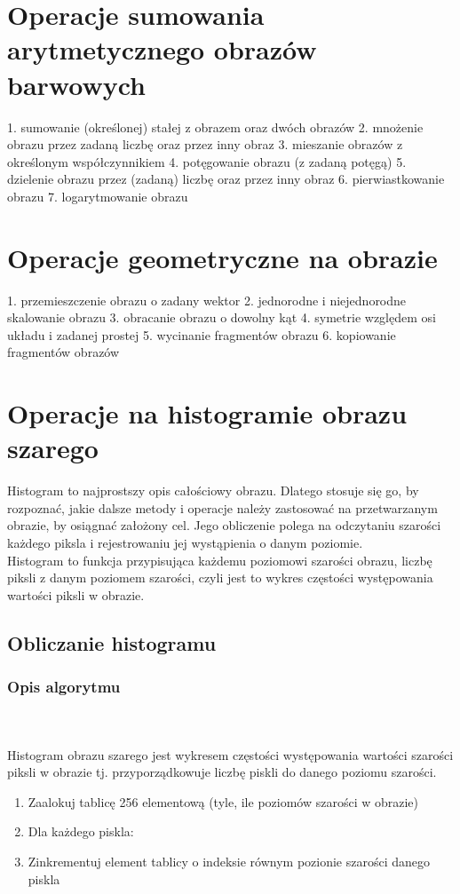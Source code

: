 \documentclass[final,a4paper,openany,12pt]{mwbk}
\begin{document}
\chapter{Operacje sumowania arytmetycznego obrazów barwowych}
1. sumowanie (określonej) stałej z obrazem oraz dwóch obrazów
2. mnożenie obrazu przez zadaną liczbę oraz przez inny obraz
3. mieszanie obrazów z określonym współczynnikiem
4. potęgowanie obrazu (z zadaną potęgą)
5. dzielenie obrazu przez (zadaną) liczbę oraz przez inny obraz
6. pierwiastkowanie obrazu
7. logarytmowanie obrazu

\chapter{Operacje geometryczne na obrazie}
1. przemieszczenie obrazu o zadany wektor
2. jednorodne i niejednorodne skalowanie obrazu
3. obracanie obrazu o dowolny kąt
4. symetrie względem osi układu i zadanej prostej
5. wycinanie fragmentów obrazu
6. kopiowanie fragmentów obrazów

\chapter{Operacje na histogramie obrazu szarego}
Histogram to najprostszy opis całościowy obrazu. Dlatego stosuje się go, by rozpoznać, jakie dalsze metody i operacje należy zastosować na przetwarzanym obrazie, by osiągnać założony cel. Jego obliczenie polega na odczytaniu szarości każdego piksla i rejestrowaniu jej wystąpienia o danym poziomie.\\
Histogram to funkcja przypisująca każdemu poziomowi szarości obrazu, liczbę piksli z danym poziomem szarości, czyli jest to wykres częstości występowania wartości piksli w obrazie.
\newpage


\section{Obliczanie histogramu}
\subsection*{Opis algorytmu}
\hfill
\\\\
\indent 
Histogram obrazu szarego jest wykresem częstości występowania wartości szarości piksli w obrazie tj.
przyporządkowuje liczbę piskli do danego poziomu szarości.\newline
\begin{enumerate}
	\item Zaalokuj tablicę 256 elementową (tyle, ile poziomów szarości w obrazie)
	\item Dla każdego piskla:
	\item Zinkrementuj element tablicy o indeksie równym pozionie szarości danego piskla
\end{enumerate}
\end{document}
